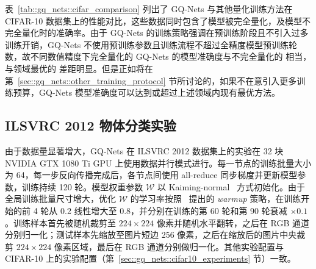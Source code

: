 表~\ref{tab::gq_nets::cifar_comparison} 列出了 GQ-Nets 与其他量化训练方法在 CIFAR-10 数据集上的性能对比，这些数据同时包含了模型被完全量化，及模型不完全量化时的准确率。由于 GQ-Nets 的训练策略强调在预训练阶段且不引入过多训练开销，GQ-Nets 不使用预训练参数且训练流程不超过全精度模型预训练轮数，故不同数值精度下完全量化的 GQ-Nets 的模型准确度与不完全量化的 \citet{zhou2016dorefanet} 相当，与领域最优的 \citet{Zhang_2018, li2019additive} 差距明显。但是正如将在第~\ref{sec::gq_nets::other_training_protocol} 节所讨论的，如果不在意引入更多训练预算，GQ-Nets 模型准确度可以达到或超过上述领域内现有最优方法。
\subsection{ILSVRC 2012 物体分类实验}
由于数据量显著增大，GQ-Nets 在 ILSVRC 2012 数据集上的实验在 32 块 NVIDIA GTX 1080 Ti GPU 上使用数据并行模式进行。每一节点的训练批量大小为 64，每一步反向传播完成后，各节点间使用 all-reduce 同步梯度并更新模型参数，训练持续 120 轮。模型权重参数 $\mathcal{W}$ 以 Kaiming-normal~\citep{He_2015} 方式初始化。由于全局训练批量尺寸增大，优化 $\mathcal{W}$ 的学习率按照~\citet{goyal2017accurate} 提出的 \emph{warmup} 策略，在训练开始的前 4 轮从 0.2 线性增大至 0.8，并分别在训练的第 60 轮和第 90 轮衰减 $\times 0.1$。训练样本首先被随机裁剪至 $224\times 224$ 像素并随机水平翻转，之后在 RGB 通道分别归一化；测试样本先缩放至图片短边 256 像素，之后在缩放后的图片中央裁剪 $224\times 224$ 像素区域，最后在 RGB 通道分别做归一化。其他实验配置与 CIFAR-10 上的实验配置（第~\ref{sec::gq_nets::cifar10_experiments} 节）一致。

